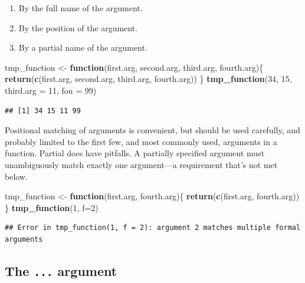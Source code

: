 \documentclass[
]{krantz}
\newenvironment{Shaded}{\begin{snugshade}}{\end{snugshade}}
\newcommand{\ControlFlowTok}[1]{\textcolor[rgb]{0.13,0.29,0.53}{\textbf{#1}}}
\newcommand{\DataTypeTok}[1]{\textcolor[rgb]{0.13,0.29,0.53}{#1}}
\newcommand{\DecValTok}[1]{\textcolor[rgb]{0.00,0.00,0.81}{#1}}
\newcommand{\KeywordTok}[1]{\textcolor[rgb]{0.13,0.29,0.53}{\textbf{#1}}}
\newcommand{\NormalTok}[1]{#1}
\newcommand{\StringTok}[1]{\textcolor[rgb]{0.31,0.60,0.02}{#1}}
\providecommand{\tightlist}{%
  \setlength{\itemsep}{0pt}\setlength{\parskip}{0pt}}
\begin{document}
\begin{enumerate}
\def\labelenumi{\arabic{enumi}.}
\tightlist
\item
  By the full name of the argument.
\item
  By the position of the argument.
\item
  By a partial name of the argument.
\end{enumerate}

\begin{Shaded}
\begin{Highlighting}[]
\NormalTok{tmp\_function \textless{}{-}}\StringTok{ }\ControlFlowTok{function}\NormalTok{(first.arg, second.arg, third.arg, fourth.arg)\{}
    \KeywordTok{return}\NormalTok{(}\KeywordTok{c}\NormalTok{(first.arg, second.arg, third.arg, fourth.arg))}
\NormalTok{\}}
\KeywordTok{tmp\_function}\NormalTok{(}\DecValTok{34}\NormalTok{, }\DecValTok{15}\NormalTok{, }\DataTypeTok{third.arg =} \DecValTok{11}\NormalTok{, }\DataTypeTok{fou =} \DecValTok{99}\NormalTok{)}
\end{Highlighting}
\end{Shaded}

\begin{verbatim}
## [1] 34 15 11 99
\end{verbatim}

Positional matching of arguments is convenient, but should be used carefully, and probably limited to the first few, and most commonly used, arguments in a function. Partial does have pitfalls. A partially specified argument must unambiguously match exactly one argument---a requirement that's not met below.

\begin{Shaded}
\begin{Highlighting}[]
\NormalTok{tmp\_function \textless{}{-}}\StringTok{ }\ControlFlowTok{function}\NormalTok{(first.arg, fourth.arg)\{}
    \KeywordTok{return}\NormalTok{(}\KeywordTok{c}\NormalTok{(first.arg, fourth.arg))}
\NormalTok{\}}
\KeywordTok{tmp\_function}\NormalTok{(}\DecValTok{1}\NormalTok{, }\DataTypeTok{f=}\DecValTok{2}\NormalTok{)}
\end{Highlighting}
\end{Shaded}

\begin{verbatim}
## Error in tmp_function(1, f = 2): argument 2 matches multiple formal arguments
\end{verbatim}

\hypertarget{the-...-argument}{%
\subsection{\texorpdfstring{The \texttt{...} argument}{The ... argument}}\label{the-...-argument}}
\end{document}
